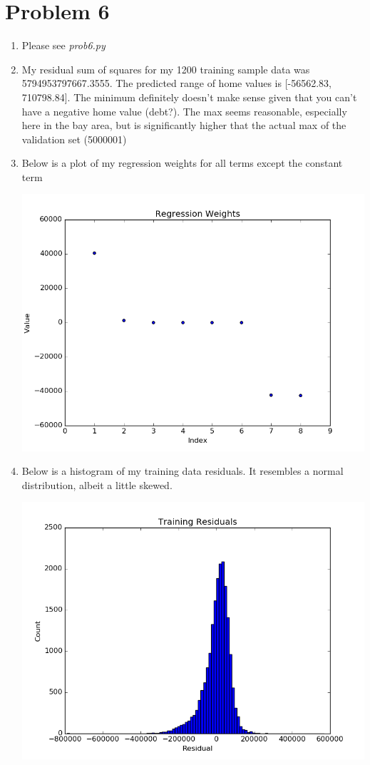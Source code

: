 \documentclass{article}
\begin{document}
\section*{Problem 6}
\begin{enumerate}
  \item Please see \textit{prob6.py}
  \item My residual sum of squares for my 1200 training sample data was 5794953797667.3555. The predicted range of home values is [-56562.83, 710798.84]. The minimum definitely doesn't make sense given that you can't have a negative home value (debt?). The max seems reasonable, especially here in the bay area, but is significantly higher that the actual max of the validation set (5000001)
  \item Below is a plot of my regression weights for all terms except the constant term
    \begin{center}
      \includegraphics[scale=0.5]{prob6_3}
    \end{center}
  \item Below is a histogram of my training data residuals. It resembles a normal distribution, albeit a little skewed.
    \begin{center}
      \includegraphics[scale=0.5]{prob6_4}
    \end{center}
\end{enumerate}
\end{document}
